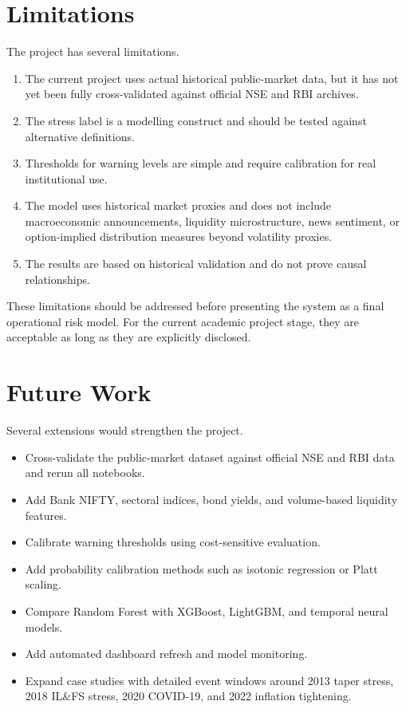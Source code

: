 \documentclass[12pt,a4paper]{article}
\begin{document}
\section{Limitations}

The project has several limitations.

\begin{enumerate}
    \item The current project uses actual historical public-market data, but it has not yet been fully cross-validated against official NSE and RBI archives.
    \item The stress label is a modelling construct and should be tested against alternative definitions.
    \item Thresholds for warning levels are simple and require calibration for real institutional use.
    \item The model uses historical market proxies and does not include macroeconomic announcements, liquidity microstructure, news sentiment, or option-implied distribution measures beyond volatility proxies.
    \item The results are based on historical validation and do not prove causal relationships.
\end{enumerate}

These limitations should be addressed before presenting the system as a final operational risk model. For the current academic project stage, they are acceptable as long as they are explicitly disclosed.

\section{Future Work}

Several extensions would strengthen the project.

\begin{itemize}
    \item Cross-validate the public-market dataset against official NSE and RBI data and rerun all notebooks.
    \item Add Bank NIFTY, sectoral indices, bond yields, and volume-based liquidity features.
    \item Calibrate warning thresholds using cost-sensitive evaluation.
    \item Add probability calibration methods such as isotonic regression or Platt scaling.
    \item Compare Random Forest with XGBoost, LightGBM, and temporal neural models.
    \item Add automated dashboard refresh and model monitoring.
    \item Expand case studies with detailed event windows around 2013 taper stress, 2018 IL\&FS stress, 2020 COVID-19, and 2022 inflation tightening.
\end{itemize}
\end{document}
